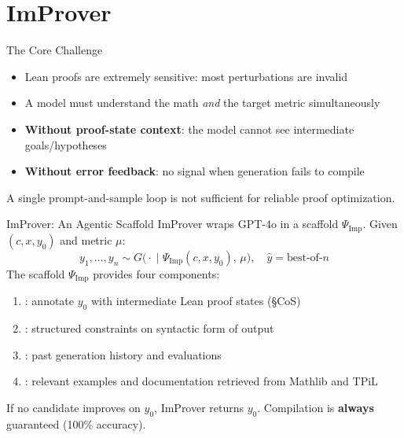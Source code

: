 \section{ImProver}

\begin{frame}{The Core Challenge}
\vspace{0.8em}
\begin{itemize}\setlength{\itemsep}{10pt}
  \item Lean proofs are extremely sensitive: most perturbations are invalid
  \item A model must understand the math \emph{and} the target metric simultaneously
  \item \textbf{Without proof-state context}: the model cannot see intermediate goals/hypotheses
  \item \textbf{Without error feedback}: no signal when generation fails to compile
\end{itemize}
\vspace{0.8em}
\begin{alertblock}{}
  A single prompt-and-sample loop is not sufficient for reliable proof optimization.
\end{alertblock}
\end{frame}

\begin{frame}{ImProver: An Agentic Scaffold}
\vspace{0.3em}
ImProver wraps GPT-4o in a scaffold $\Psi_{\mathrm{Imp}}$. Given $(c, x, y_0)$ and metric $\mu$:
\[
  y_1,\dots,y_n \sim G\bigl(\cdot \;\big|\; \Psi_{\mathrm{Imp}}(c, x, y_0),\, \mu\bigr), \quad \hat{y} = \text{best-of-}n
\]
\vspace{0.2em}
The scaffold $\Psi_{\mathrm{Imp}}$ provides four components:
\begin{enumerate}\setlength{\itemsep}{5pt}
  \item {}: annotate $y_0$ with intermediate Lean proof states (\S CoS)
  \item {}: structured constraints on syntactic form of output
  \item {}: past generation history and evaluations
  \item {}: relevant examples and documentation retrieved from Mathlib and TPiL
\end{enumerate}
\vspace{0.3em}
\begin{exampleblock}{}
  If no candidate improves on $y_0$, ImProver returns $y_0$. Compilation is \textbf{always} guaranteed (100\% accuracy).
\end{exampleblock}
\end{frame}


